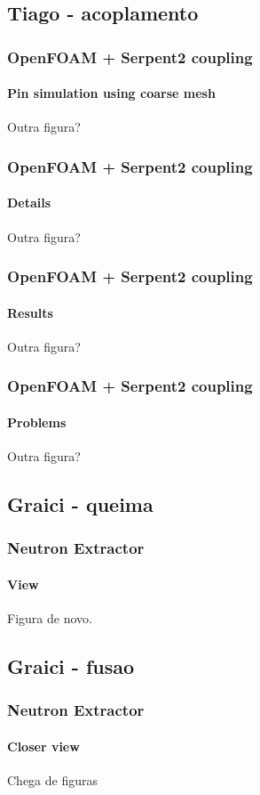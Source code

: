 \documentclass[svgnames,smaller,table]{beamer}
\begin{document}
\subsection{Tiago - acoplamento}
\begin{frame}
  \frametitle{OpenFOAM + Serpent2 coupling}
  \framesubtitle{Pin simulation using coarse mesh}
  \begin{center}
    Outra figura?
  \end{center}
\end{frame}

\begin{frame}
  \frametitle{OpenFOAM + Serpent2 coupling}
  \framesubtitle{Details}
  \begin{center}
    Outra figura?
  \end{center}
\end{frame}

\begin{frame}
  \frametitle{OpenFOAM + Serpent2 coupling}
  \framesubtitle{Results}
  \begin{center}
    Outra figura?
  \end{center}
\end{frame}

\begin{frame}
  \frametitle{OpenFOAM + Serpent2 coupling}
  \framesubtitle{Problems}
  \begin{center}
    Outra figura?
  \end{center}
\end{frame}

\subsection{Graici - queima}
\begin{frame}
  \frametitle{Neutron Extractor}
  \framesubtitle{View}
  \begin{center}
    Figura de novo.
  \end{center}
\end{frame}

\subsection{Graici - fusao}
\begin{frame}
  \frametitle{Neutron Extractor}
  \framesubtitle{Closer view}
  \begin{center}
    Chega de figuras
  \end{center}
\end{frame}
\end{document}
